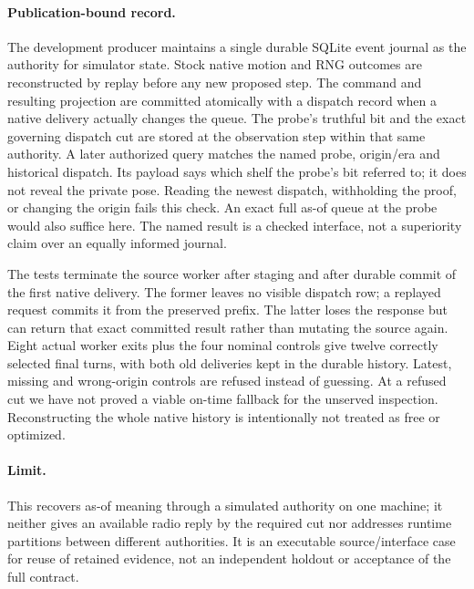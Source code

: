 \documentclass{article}
\begin{document}
\paragraph{Publication-bound record.}
The development producer maintains a single durable SQLite
event journal as the authority for simulator state. Stock
native motion and RNG outcomes are reconstructed by replay
before any new proposed step. The command and resulting
projection are committed atomically with a dispatch record
when a native delivery actually changes the queue.
The probe's truthful bit and the exact governing dispatch
cut are stored at the observation step within that same
authority. A later authorized query matches the named probe,
origin/era and historical dispatch. Its payload says which
shelf the probe's bit referred to; it does not reveal the
private pose. Reading the newest dispatch, withholding
the proof, or changing the origin fails this check.
An exact full as-of queue at the probe would also suffice
here. The named result is a checked interface, not a
superiority claim over an equally informed journal.

The tests terminate the source worker after staging and
after durable commit of the first native delivery.
The former leaves no visible dispatch row; a replayed
request commits it from the preserved prefix. The latter
loses the response but can return that exact committed
result rather than mutating the source again. Eight actual
worker exits plus the four nominal controls give twelve
correctly selected final turns, with both old deliveries
kept in the durable history. Latest, missing and wrong-origin
controls are refused instead of guessing. At a refused
cut we have not proved a viable on-time fallback for the
unserved inspection. Reconstructing the whole native history
is intentionally not treated as free or optimized.

\paragraph{Limit.}
This recovers as-of meaning through a simulated authority
on one machine; it neither gives an available radio reply by
the required cut nor addresses runtime partitions between
different authorities. It is an executable source/interface
case for reuse of retained evidence, not an independent
holdout or acceptance of the full contract.
\end{document}
